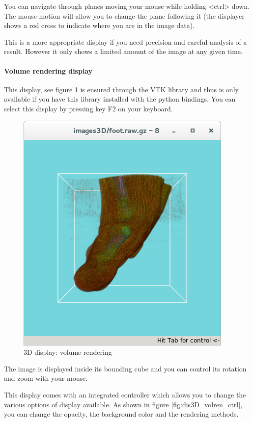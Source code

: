 \documentclass[a4paper,10pt,oneside]{article}
\begin{document}
You can navigate through planes moving your mouse while holding <ctrl> down.
The mouse motion will allow you to change the plane following it (the displayer
shows a red cross to indicate where you are in the image data).

This is a more appropriate display if you need precision and careful
analysis of a result. However it only shows a limited amount of the
image at any given time.

\paragraph{Volume rendering display}

This display, see figure \ref{fig:dis3D_volren} is ensured through the VTK
library and thus is only available if you have this library installed with
the python bindings.
You can select this display by pressing key F2 on your keyboard.

\begin{figure}
\centering
\includegraphics[scale=0.5]{images/dis3D_volren.png}
\caption{3D display: volume rendering}
\label{fig:dis3D_volren}
\end{figure}

The image is displayed inside its bounding cube and you can control its rotation
and zoom with your mouse.

This display comes with an integrated controller which allows you to change
the various options of display available. As shown in figure \ref{fig:dis3D_volren_ctrl},
you can change the opacity, the background color and the rendering methods.
\end{document}
